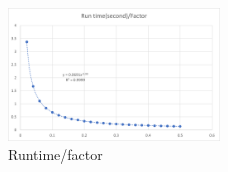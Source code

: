 \documentclass[12pt]{article}
\begin{document}
\begin{figure}[hbt!]
  \centering
  \includegraphics[width=0.5\textwidth,height=\textheight,keepaspectratio]{Figures/mergesort_three_bottom_up_sorted_factors.png}
  \caption{Runtime/factor  \\ }
  \label{r5}
\end{figure}
\end{document}
